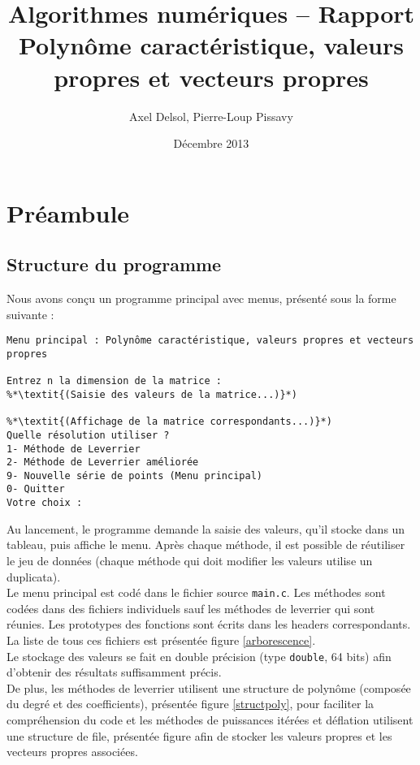 \documentclass{report}
\title{Algorithmes numériques -- Rapport \\ \vspace{0.5cm}Polynôme caractéristique, valeurs propres et vecteurs propres}
\author{Axel Delsol, Pierre-Loup Pissavy}
\date{Décembre 2013}
\begin{document}
  \maketitle
  \tableofcontents
  
  \chapter{Préambule}
    \section{Structure du programme}
    Nous avons conçu un programme principal avec menus, présenté sous la forme suivante :
      \begin{lstlisting}[style=apercu, name=Menu Principal]
Menu principal : Polynôme caractéristique, valeurs propres et vecteurs propres

Entrez n la dimension de la matrice : 
%*\textit{(Saisie des valeurs de la matrice...)}*)

%*\textit{(Affichage de la matrice correspondants...)}*)
Quelle résolution utiliser ?
1- Méthode de Leverrier
2- Méthode de Leverrier améliorée
9- Nouvelle série de points (Menu principal)
0- Quitter
Votre choix :
      \end{lstlisting}
      
      Au lancement, le programme demande la saisie des valeurs, qu'il stocke dans un tableau, puis affiche le menu. Après chaque méthode, il est possible de réutiliser le jeu de données (chaque méthode qui doit modifier les valeurs utilise un duplicata). \\

Le menu principal est codé dans le fichier source \verb"main.c". Les méthodes sont codées dans des fichiers individuels sauf les méthodes de leverrier qui sont réunies. Les prototypes des fonctions sont écrits dans les headers correspondants. 
La liste de tous ces fichiers est présentée figure \ref{arborescence}.\\

Le stockage des valeurs se fait en double précision (type \verb"double", 64 bits) afin d'obtenir des résultats suffisamment précis.\\
De plus, les méthodes de leverrier utilisent une structure de polynôme (composée du degré et des coefficients), présentée figure \ref{structpoly}, pour faciliter la compréhension du code et les méthodes de puissances itérées et déflation utilisent une structure de file, présentée figure  afin de stocker les valeurs propres et les vecteurs propres associées.
\end{document}
